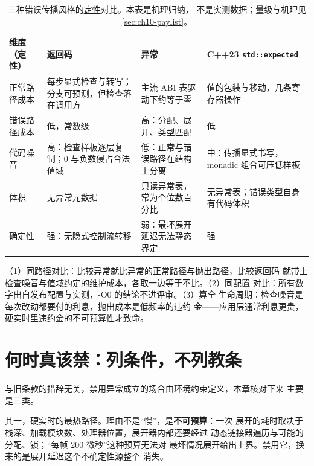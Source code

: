 \documentclass[12pt,a4paper,fontset=fandol]{ctexbook}
\newcommand{\cpp}[1]{C++#1}
\newcommand{\Tp}[1]{\texttt{#1}}
\begin{document}
\begin{table}[htbp]
\centering
\caption{三种错误传播风格的\underline{定性}对比。本表是机理归纳，
不是实测数据；量级与机理见 \ref{sec:ch10-paylist}。}\label{tab:ch10-styles}
\begin{tabularx}{\textwidth}{@{}>{\raggedright\arraybackslash}p{}
  >{\raggedright\arraybackslash}X
  >{\raggedright\arraybackslash}X
  >{\raggedright\arraybackslash}X@{}}
\toprule
维度（定性） & 返回码 & 异常 & \cpp{23} \Tp{std::expected} \\
\midrule
正常路径成本 &
  每步显式检查与转写；分支可预测，但检查落在调用方 &
  主流 ABI 表驱动下约等于零 &
  值的包装与移动，几条寄存器操作
\\
错误路径成本 &
  低，常数级 &
  高：分配、展开、类型匹配 &
  低
\\
代码噪音 &
  高：检查样板逐层复制；0 与负数侵占合法值域 &
  低：正常与错误路径在结构上分离 &
  中：传播显式书写，monadic 组合可压低样板
\\
体积 &
  无异常元数据 &
  只读异常表，常为个位数百分比 &
  无异常表；错误类型自身有代码体积
\\
确定性 &
  强：无隐式控制流转移 &
  弱：最坏展开延迟无法静态界定 &
  强
\\
\end{tabularx}
\end{table}

\begin{compare}[title={公平对比的三条规则}]
（1）同路径对比：比较异常就比异常的正常路径与抛出路径，比较返回码
就带上检查噪音与值域约定的维护成本，各取一边等于不比。（2）同配置
对比：所有数字出自发布配置与实测，-O0 的结论不进评审。（3）算全
生命周期：检查噪音是每次改动都要付的利息，抛出成本是低频率的违约
金——应用层通常利息更贵，硬实时里违约金的不可预算性才致命。
\end{compare}

\section{何时真该禁：列条件，不列教条}
\label{sec:ch10-whoban}

与旧条款的措辞无关，禁用异常成立的场合由环境约束定义，本章核对下来
主要是三类。

其一，硬实时的最热路径。理由不是``慢''，是\textbf{不可预算}：一次
展开的耗时取决于栈深、加载模块数、处理器位置，展开器内部还要经过
动态链接器遍历与可能的分配、锁；``每帧 200 微秒''这种预算无法对
最坏情况展开给出上界。禁用它，换来的是展开延迟这个不确定性源整个
消失。
\end{document}
